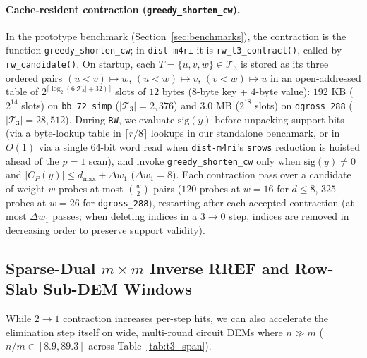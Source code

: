 \documentclass[12pt]{article}
\theoremstyle{definition}
\newcommand{\Tc}{\mathcal{T}_3}
\newcommand{\ttt}[1]{\texttt{#1}}
\begin{document}
\paragraph{Cache-resident contraction (\ttt{greedy\_shorten\_cw}).}
In the prototype benchmark (Section~\ref{sec:benchmarks}), the contraction is the function \ttt{greedy\_shorten\_cw};
in \ttt{dist-m4ri} it is \ttt{rw\_t3\_contract()}, called by \ttt{rw\_candidate()}.
On startup, each $T = \{u, v, w\} \in \Tc$ is stored as its three ordered pairs $(u < v) \mapsto w$, $(u < w)
\mapsto v$, $(v < w) \mapsto u$ in an open-addressed table of $2^{\lceil \log_2(6|\Tc| + 32) \rceil}$ slots of $12$
bytes ($8$-byte key + $4$-byte value): $192\text{ KB}$ ($2^{14}$ slots) on \ttt{bb\_72\_simp} ($|\Tc| = 2{,}376$)
and $3.0\text{ MB}$ ($2^{18}$ slots) on \ttt{dgross\_288} ($|\Tc| = 28{,}512$). During \ttt{RW}, we evaluate
$\mathrm{sig}(y)$ before unpacking support bits (via a byte-lookup table in $\lceil r / 8 \rceil$ lookups in our
standalone benchmark, or in $O(1)$ via a single 64-bit word read when \ttt{dist-m4ri}'s \ttt{srows} reduction is
hoisted ahead of the $p = 1$ scan), and invoke \ttt{greedy\_shorten\_cw} only when $\mathrm{sig}(y) \neq 0$ and
$|C_P(y)| \le d_{\max} + \Delta w_1$ ($\Delta w_1 = 8$). Each contraction pass over a candidate of weight $w$
probes at most $\binom{w}{2}$ pairs ($120$ probes at $w = 16$ for $d \le 8$, $325$ probes at $w = 26$ for
\ttt{dgross\_288}), restarting after each accepted contraction (at most $\Delta w_1$ passes; when deleting indices
in a $3 \to 0$ step, indices are removed in decreasing order to preserve support validity).

\subsection{Sparse-Dual \texorpdfstring{$m \times m$}{m x m} Inverse RREF and Row-Slab Sub-DEM
  Windows}\label{subsec:dual_and_slab}

While $2 \to 1$ contraction increases per-step hits, we can also accelerate the elimination step itself on wide,
multi-round circuit DEMs where $n \gg m$ ($n / m \in [8.9, 89.3]$ across Table~\ref{tab:t3_span}).
\end{document}

